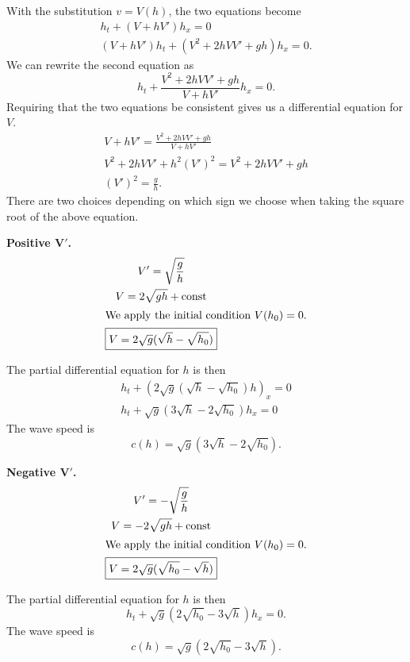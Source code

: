 \begin{Solution}
  With the substitution $v = V(h)$, the two equations become
  \begin{gather*}
    h_t + (V + h V')h_x = 0 \\
    (V + h V')h_t + (V^2 + 2 h V V' + gh)h_x = 0.
  \end{gather*}
  We can rewrite the second equation as
  \[ h_t + \frac{V^2 + 2 h V V' + gh}{V + hV'} h_x = 0. \]
  Requiring that the two equations be consistent gives us a differential 
  equation for $V$.
  \begin{gather*}
    V + h V' = \frac{V^2 + 2 h V V' + gh}{V + hV'} \\
    V^2 + 2 h V V' + h^2 (V')^2 = V^2 + 2 h V V' + gh \\
    (V')^2 = \frac{g}{h}.
  \end{gather*}
  There are two choices depending on which sign we choose when taking the
  square root of the above equation.

  \textbf{Positive $\mathbf{V'}$.}
  \begin{gather*}
    V' = \sqrt{\frac{g}{h}} \\
    V = 2 \sqrt{g h} + \mathrm{const} \\
    \intertext{We apply the initial condition $V(h_0) = 0$.}
    \boxed{ V = 2 \sqrt{g}(\sqrt{h} - \sqrt{h_0}) }
  \end{gather*}

  The partial differential equation for $h$ is then
  \begin{gather*}
    h_t + (2 \sqrt{g}(\sqrt{h} - \sqrt{h_0})h)_x = 0 \\
    \boxed{ h_t + \sqrt{g}(3 \sqrt{h} - 2 \sqrt{h_0}) h_x = 0}
  \end{gather*}
  The wave speed is
  \[ \boxed{ c(h) = \sqrt{g}(3 \sqrt{h} - 2 \sqrt{h_0}). } \]


  \textbf{Negative $\mathbf{V'}$.}
  \begin{gather*}
    V' = - \sqrt{\frac{g}{h}} \\
    V = - 2 \sqrt{g h} + \mathrm{const} \\
    \intertext{We apply the initial condition $V(h_0) = 0$.}
    \boxed{ V = 2 \sqrt{g}(\sqrt{h_0} - \sqrt{h}) }
  \end{gather*}

  The partial differential equation for $h$ is then
  \[ \boxed{ h_t + \sqrt{g}(2 \sqrt{h_0} - 3 \sqrt{h}) h_x = 0.} \]
  The wave speed is
  \[ \boxed{ c(h) = \sqrt{g}(2 \sqrt{h_0} - 3 \sqrt{h}). } \]
\end{Solution}



